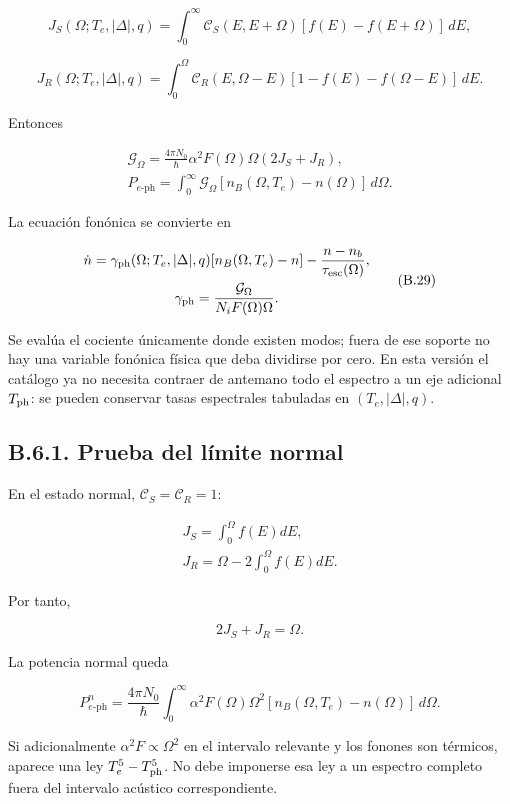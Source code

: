 \documentclass[
  spanish,
  10pt,
  a4paper,
]{article}
\newcounter{none} %
\begin{document}
\[
J_S(\Omega;T_e,|\Delta|,q)=\int_0^\infty
\mathcal C_S(E,E+\Omega)[f(E)-f(E+\Omega)]\,dE, \tag{B.26}
\]

\[
J_R(\Omega;T_e,|\Delta|,q)=\int_0^\Omega
\mathcal C_R(E,\Omega-E)[1-f(E)-f(\Omega-E)]\,dE. \tag{B.27}
\]

Entonces

\[
\begin{gathered}
\mathcal G_\Omega=\frac{4\pi N_0}{\hbar}\alpha^2F(\Omega)\Omega(2J_S+J_R),\\
P_{e\text{-ph}}=\int_0^\infty\mathcal G_\Omega
[n_B(\Omega,T_e)-n(\Omega)]\,d\Omega.
\end{gathered} \tag{B.28}
\]

La ecuación fonónica se convierte en

\[
\begin{gathered}
\dot n=\gamma_{\rm ph}(\Omega;T_e,|\Delta|,q)
[n_B(\Omega,T_e)-n]-\frac{n-n_b}{\tau_{\rm esc}(\Omega)},\\
\gamma_{\rm ph}=\frac{\mathcal G_\Omega}{N_iF(\Omega)\Omega}.
\end{gathered} \tag{B.29}
\]

Se evalúa el cociente únicamente donde existen modos; fuera de ese
soporte no hay una variable fonónica física que deba dividirse por cero.
En esta versión el catálogo ya no necesita contraer de antemano todo el
espectro a un eje adicional \(T_{\rm ph}\): se pueden conservar tasas
espectrales tabuladas en \((T_e,|\Delta|,q)\).

\subsection{B.6.1. Prueba del límite
normal}\label{b.6.1.-prueba-del-luxedmite-normal}

En el estado normal, \(\mathcal C_S=\mathcal C_R=1\):

\[
\begin{gathered}
J_S=\int_0^\Omega f(E)dE,\\
J_R=\Omega-2\int_0^\Omega f(E)dE.
\end{gathered}
\]

Por tanto,

\[
2J_S+J_R=\Omega. \tag{B.30}
\]

La potencia normal queda

\[
P_{e\text{-ph}}^{n}=\frac{4\pi N_0}{\hbar}
\int_0^\infty\alpha^2F(\Omega)\Omega^2
[n_B(\Omega,T_e)-n(\Omega)]\,d\Omega. \tag{B.31}
\]

Si adicionalmente \(\alpha^2F\propto\Omega^2\) en el intervalo relevante
y los fonones son térmicos, aparece una ley \(T_e^5-T_{\rm ph}^5\). No
debe imponerse esa ley a un espectro completo fuera del intervalo
acústico correspondiente.
\end{document}
